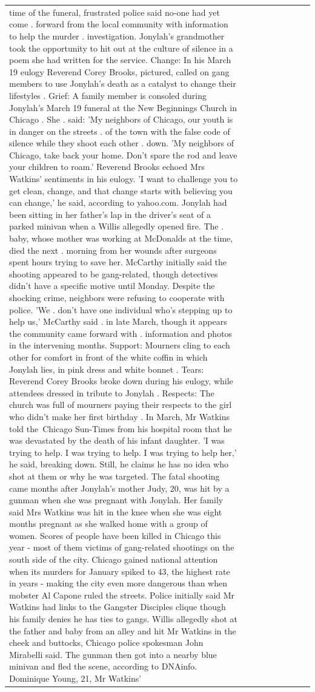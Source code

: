 \begin{table}[H]
\begin{tabular}{lllrlllll}
time of the funeral, frustrated police said no-one had yet come . forward from the local community with information to help the murder . investigation. Jonylah's grandmother took the opportunity to hit out at the culture of silence in a poem she had written for the service. Change: In his March 19 eulogy Reverend Corey Brooks, pictured, called on gang members to use Jonylah's death as a catalyst to change their lifestyles . Grief: A family member is consoled during Jonylah's March 19 funeral at the New Beginnings Church in Chicago . She . said: 'My neighbors of Chicago, our youth is in danger on the streets . of the town with the false code of silence while they shoot each other . down. 'My neighbors of Chicago, take back your home. Don't spare the rod and leave your children to roam.' Reverend Brooks echoed Mrs Watkins' sentiments in his eulogy. 'I want to challenge you to get clean, change, and that change starts with believing you can change,' he said, according to yahoo.com. Jonylah had been sitting in her father's lap in the driver's seat of a parked minivan when a Willis allegedly opened fire. The . baby, whose mother was working at McDonalds at the time, died the next . morning from her wounds after surgeons spent hours trying to save her. McCarthy initially said the shooting appeared to be gang-related, though detectives didn't have a specific motive until Monday. Despite the shocking crime, neighbors were refusing to cooperate with police. 'We . don't have one individual who's stepping up to help us,' McCarthy said . in late March, though it appears the community came forward with . information and photos in the intervening months. Support: Mourners cling to each other for comfort in front of the white coffin in which Jonylah lies, in pink dress and white bonnet . Tears: Reverend Corey Brooks broke down during his eulogy, while attendees dressed in tribute to Jonylah . Respects: The church was full of mourners paying their respects to the girl who didn't make her first birthday . In March, Mr Watkins told the Chicago Sun-Times from his hospital room that he was devastated by the death of his infant daughter. 'I was trying to help. I was trying to help. I was trying to help her,' he said, breaking down. Still, he claims he has no idea who shot at them or why he was targeted. The fatal shooting came months after Jonylah's mother Judy, 20, was hit by a gunman when she was pregnant with Jonylah. Her family said Mrs Watkins was hit in the knee when she was eight months pregnant as she walked home with a group of women. Scores of people have been killed in Chicago this year - most of them victims of gang-related shootings on the south side of the city. Chicago gained national attention when its murders for January spiked to 43, the highest rate in years - making the city even more dangerous than when mobster Al Capone ruled the streets. Police initially said Mr Watkins had links to the Gangster Disciples clique though his family denies he has ties to gangs. Willis allegedly shot at the father and baby from an alley and hit Mr Watkins in the cheek and buttocks, Chicago police spokesman John Mirabelli said. The gunman then got into a nearby blue minivan and fled the scene, according to DNAinfo. Dominique Young, 21, Mr Watkins' 
\end{tabular}
\end{table}
